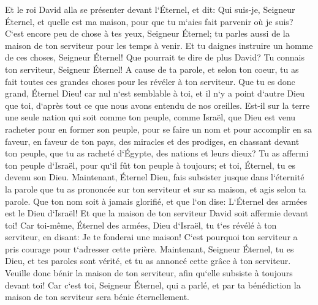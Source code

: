 \verse Et le roi David alla se présenter devant l`Éternel, et dit: Qui suis-je, Seigneur Éternel, et quelle est ma maison, pour que tu m`aies fait parvenir où je suis? 
\verse C`est encore peu de chose à tes yeux, Seigneur Éternel; tu parles aussi de la maison de ton serviteur pour les temps à venir. Et tu daignes instruire un homme de ces choses, Seigneur Éternel! 
\verse Que pourrait te dire de plus David? Tu connais ton serviteur, Seigneur Éternel! 
\verse A cause de ta parole, et selon ton coeur, tu as fait toutes ces grandes choses pour les révéler à ton serviteur. 
\verse Que tu es donc grand, Éternel Dieu! car nul n`est semblable à toi, et il n`y a point d`autre Dieu que toi, d`après tout ce que nous avons entendu de nos oreilles. 
\verse Est-il sur la terre une seule nation qui soit comme ton peuple, comme Israël, que Dieu est venu racheter pour en former son peuple, pour se faire un nom et pour accomplir en sa faveur, en faveur de ton pays, des miracles et des prodiges, en chassant devant ton peuple, que tu as racheté d`Égypte, des nations et leurs dieux? 
\verse Tu as affermi ton peuple d`Israël, pour qu`il fût ton peuple à toujours; et toi, Éternel, tu es devenu son Dieu. 
\verse Maintenant, Éternel Dieu, fais subsister jusque dans l`éternité la parole que tu as prononcée sur ton serviteur et sur sa maison, et agis selon ta parole. 
\verse Que ton nom soit à jamais glorifié, et que l`on dise: L`Éternel des armées est le Dieu d`Israël! Et que la maison de ton serviteur David soit affermie devant toi! 
\verse Car toi-même, Éternel des armées, Dieu d`Israël, tu t`es révélé à ton serviteur, en disant: Je te fonderai une maison! C`est pourquoi ton serviteur a pris courage pour t`adresser cette prière. 
\verse Maintenant, Seigneur Éternel, tu es Dieu, et tes paroles sont vérité, et tu as annoncé cette grâce à ton serviteur. 
\verse Veuille donc bénir la maison de ton serviteur, afin qu`elle subsiste à toujours devant toi! Car c`est toi, Seigneur Éternel, qui a parlé, et par ta bénédiction la maison de ton serviteur sera bénie éternellement. 

